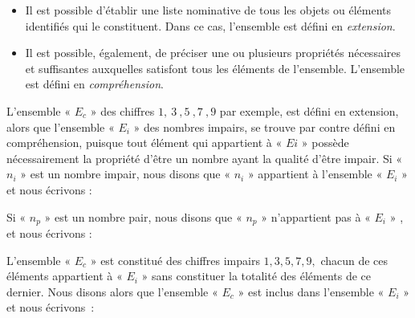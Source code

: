 \begin{itemize}
\item Il est possible d'établir une liste nominative de tous les objets
ou éléments identifiés qui le constituent. Dans ce cas, l'ensemble
est défini en \emph{extension}.
\item Il est possible, également, de préciser une ou plusieurs propriétés
nécessaires et suffisantes auxquelles satisfont tous les éléments
de l'ensemble. L'ensemble est défini en \emph{compréhension}.
\end{itemize}

L'ensemble « $E_{c}$ » des chiffres $1,\:3\:,5\:,7\:,9$ par
exemple, est défini en extension, alors que l'ensemble « $E_{i}$ » des
nombres impairs, se trouve par contre défini en compréhension, puisque
tout élément qui appartient à « $E{i}$ » possède nécessairement
la propriété d'être un nombre ayant la qualité d'être impair. Si « $n_{i}$ » est
un nombre impair, nous disons que « $n_{i}$ » appartient à l'ensemble
« $E_{i}$ » et nous écrivons :
\medskip
\begin{center}
\end{center}

\medskip


Si « $n_{p}$ » est un nombre pair, nous disons que « $n_{p}$ » 
n'appartient pas à « $E_{i}$ » , et nous écrivons :

\medskip


\begin{center}
\end{center}

\medskip


L'ensemble « $E_{c}$ » est constitué des chiffres impairs $1,3,5,7,9,$
chacun de ces éléments appartient à « $E_{i}$ » sans constituer
la totalité des éléments de ce dernier. Nous disons alors que l'ensemble
« $E_{c}$ » est inclus dans l'ensemble « $E_{i}$ » et
nous écrivons~:

\medskip


\begin{center}
\end{center}


